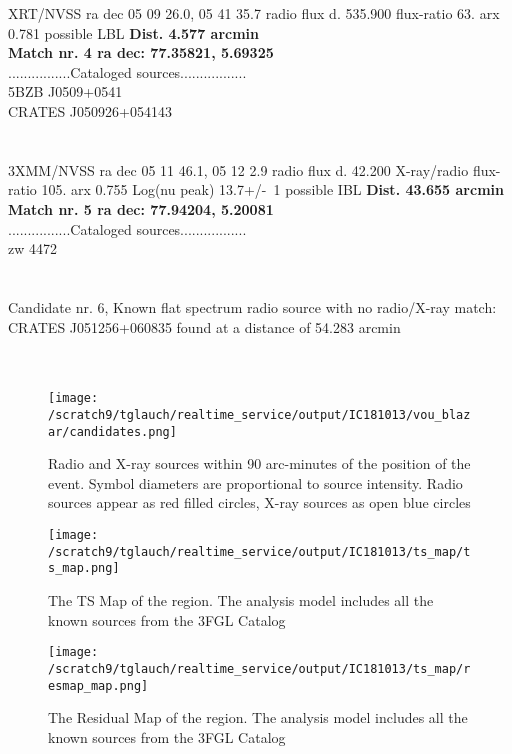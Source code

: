 \documentclass[a4paper]{article}
\begin{document}
 XRT/NVSS ra dec 05 09 26.0, 05 41 35.7 radio flux d.   535.900 flux-ratio     63. arx  0.781                         possible LBL   \textbf{Dist.   4.577 arcmin}\\ 
 \textbf{Match nr.   4        ra dec:  77.35821,  5.69325}\\ 
 ................Cataloged sources.................\\ 
 5BZB J0509+0541               \\ 
 CRATES J050926+054143         \\ 
 \\\\ 
 3XMM/NVSS ra dec 05 11 46.1, 05 12  2.9 radio flux d.   42.200 X-ray/radio flux-ratio    105. arx  0.755 Log(nu peak) 13.7+/-~1   possible IBL  \textbf{Dist.  43.655 arcmin}\\ 
 \textbf{Match nr.   5        ra dec:  77.94204,  5.20081}\\ 
 ................Cataloged sources.................\\ 
 zw  4472                      \\ 
 \\\\ 
 Candidate nr.   6, Known flat spectrum radio source with no radio/X-ray match:  CRATES J051256+060835 found at a distance of  54.283 arcmin \\ 
 \\\\ 
  


\clearpage

\begin{figure}[h!]
\centering
  \texttt{[image: /scratch9/tglauch/realtime\_service/output/IC181013/vou\_blazar/candidates.png]}
  \caption{Radio and X-ray sources within 90 arc-minutes of the position of the event. Symbol diameters are proportional to source intensity. Radio sources appear as red filled circles, X-ray sources as open blue circles}
\end{figure}

\begin{figure}[h!]
\centering
  \texttt{[image: /scratch9/tglauch/realtime\_service/output/IC181013/ts\_map/ts\_map.png]}
  \caption{The TS Map of the region. The analysis model includes all the known sources from the 3FGL Catalog}
\end{figure}

\begin{figure}[h!]
\centering
  \texttt{[image: /scratch9/tglauch/realtime\_service/output/IC181013/ts\_map/resmap\_map.png]}
  \caption{The Residual Map of the region. The analysis model includes all the known sources from the 3FGL Catalog}
\end{figure}
\end{document}
